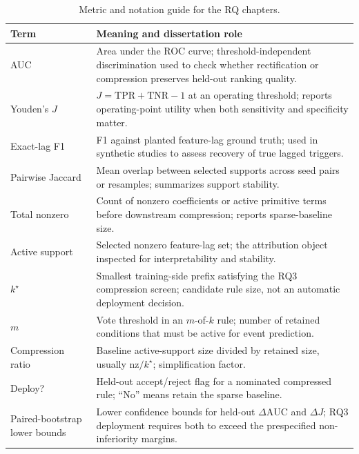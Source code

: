 \begin{table}[H]
    \caption[Metric and notation guide.]{Metric and notation guide for the RQ chapters.}
    \label{tab:metric_notation_guide}
    \centering
    {
    \setlength{\tabcolsep}{4pt}
    \renewcommand{\arraystretch}{0.92}
    \begin{tabularx}{\textwidth}{>{\RaggedRight\arraybackslash}p{}>{\RaggedRight\arraybackslash}X}
        Term & Meaning and dissertation role \\ \hline
        AUC & Area under the ROC curve; threshold-independent discrimination used to check whether rectification or compression preserves held-out ranking quality. \\ \hline
        Youden's $J$ & $J=\mathrm{TPR}+\mathrm{TNR}-1$ at an operating threshold; reports operating-point utility when both sensitivity and specificity matter. \\ \hline
        Exact-lag F1 & F1 against planted feature-lag ground truth; used in synthetic studies to assess recovery of true lagged triggers. \\ \hline
        Pairwise Jaccard & Mean overlap between selected supports across seed pairs or resamples; summarizes support stability. \\ \hline
        Total nonzero & Count of nonzero coefficients or active primitive terms before downstream compression; reports sparse-baseline size. \\ \hline
        Active support & Selected nonzero feature-lag set; the attribution object inspected for interpretability and stability. \\ \hline
        $k^\star$ & Smallest training-side prefix satisfying the RQ3 compression screen; candidate rule size, not an automatic deployment decision. \\ \hline
        $m$ & Vote threshold in an $m$-of-$k$ rule; number of retained conditions that must be active for event prediction. \\ \hline
        Compression ratio & Baseline active-support size divided by retained size, usually $\mathrm{nz}/k^\star$; simplification factor. \\ \hline
        Deploy? & Held-out accept/reject flag for a nominated compressed rule; ``No'' means retain the sparse baseline. \\ \hline
        Paired-bootstrap lower bounds & Lower confidence bounds for held-out $\Delta\mathrm{AUC}$ and $\Delta J$; RQ3 deployment requires both to exceed the prespecified non-inferiority margins. \\ \hline
    \end{tabularx}
    }
\end{table}


